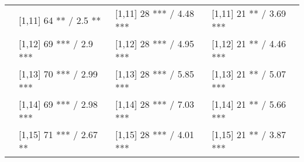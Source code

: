 \begin{table}
\begin{tabular}[t]{llll}
 & {}[1,11] 64 ** / 2.5 ** & {}[1,11] 28 *** / 4.48 *** & {}[1,11] 21 ** / 3.69 ***\\
 & {}[1,12] 69 *** / 2.9 *** & {}[1,12] 28 *** / 4.95 *** & {}[1,12] 21 ** / 4.46 ***\\
\addlinespace
 & {}[1,13] 70 *** / 2.99 *** & {}[1,13] 28 *** / 5.85 *** & {}[1,13] 21 ** / 5.07 ***\\
 & {}[1,14] 69 *** / 2.98 *** & {}[1,14] 28 *** / 7.03 *** & {}[1,14] 21 ** / 5.66 ***\\
 & {}[1,15] 71 *** / 2.67 ** & {}[1,15] 28 *** / 4.01 *** & {}[1,15] 21 ** / 3.87 ***\\
\bottomrule
\end{tabular}
\end{table}

